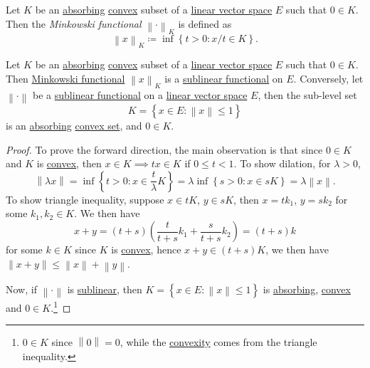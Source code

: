 \begin{definition}\label{def:Minkowski-functional}
	Let \(K\) be an \hyperref[def:absorbing]{absorbing} \hyperref[def:convex-set]{convex} subset of a \hyperref[def:linear-vector-space]{linear vector space} \(E\) such that \(0\in K\). Then the \emph{Minkowski functional} \(\left\lVert \cdot\right\rVert _K\) is defined as
	\[
		\left\lVert x\right\rVert _K \coloneqq \inf \left\{ t > 0 \colon x / t \in K \right\}.
	\]
\end{definition}

\begin{proposition}
	Let \(K\) be an \hyperref[def:absorbing]{absorbing} \hyperref[def:convex-set]{convex} subset of a \hyperref[def:linear-vector-space]{linear vector space} \(E\) such that \(0\in K\). Then \hyperref[def:Minkowski-functional]{Minkowski functional} \(\left\lVert x\right\rVert _K\) is a \hyperref[def:sublinear]{sublinear functional} on \(E\). Conversely, let \(\left\lVert \cdot\right\rVert \) be a \hyperref[def:sublinear]{sublinear functional} on a \hyperref[def:linear-vector-space]{linear vector space} \(E\), then the sub-level set
	\[
		K = \left\{ x\in E\colon \left\lVert x\right\rVert \leq 1 \right\}
	\]
	is an \hyperref[def:absorbing]{absorbing} \hyperref[def:convex-set]{convex set}, and \(0\in K\).
\end{proposition}
\begin{proof}
	To prove the forward direction, the main observation is that since \(0\in K\) and \(K\) is \hyperref[def:convex-set]{convex}, then \(x\in K \implies tx\in K\) if \(0 \leq t < 1\). To show dilation, for \(\lambda > 0\),
	\[
		\left\lVert \lambda x\right\rVert
		= \inf \left\{ t> 0\colon x \in \frac{t}{\lambda }K \right\}
		= \lambda \inf \left\{ s > 0\colon x \in sK \right\} = \lambda \left\lVert x\right\rVert.
	\]
	To show triangle inequality, suppose \(x\in tK\), \(y\in sK\), then \(x = tk_1\), \(y = sk_2\) for some \(k_1, k_2\in K\). We then have
	\[
		x + y = (t + s) \left( \frac{t}{t+s}k_1 + \frac{s}{t+s}k_2 \right) = (t + s) k
	\]
	for some \(k\in K\) since \(K\) is \hyperref[def:convex-set]{convex}, hence \(x + y \in (t + s) K\), we then have \(\left\lVert x + y\right\rVert \leq \left\lVert x\right\rVert + \left\lVert y\right\rVert \).

	Now, if \(\left\lVert \cdot\right\rVert \) is \hyperref[def:sublinear]{sublinear}, then \(K = \left\{ x\in E\colon \left\lVert x\right\rVert \leq 1 \right\} \) is \hyperref[def:absorbing]{absorbing}, \hyperref[def:convex-set]{convex} and \(0\in K\).\footnote{\(0\in K\) since \(\left\lVert 0\right\rVert = 0\), while the \hyperref[def:convex-set]{convexity} comes from the triangle inequality.}
\end{proof}

